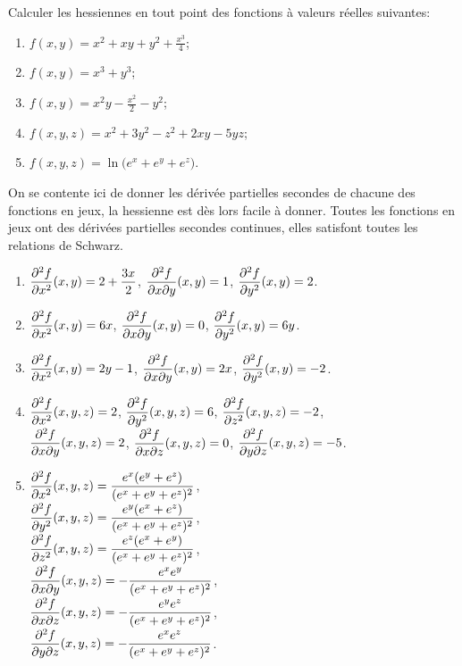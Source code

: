 \documentclass[11pt, a4paper]{article}
\begin{document}
\begin{question}
  \label{eq:hessienne}
  Calculer les hessiennes en tout point des fonctions à valeurs
  réelles suivantes:
  \begin{enumerate}
  \item $f(x, y) = x^2 + xy + y^2 + \displaystyle{\frac{x^3}{4}}$;
  \item $f(x, y) = x^3 + y^3$;
  \item $f(x, y) = x^2y - \displaystyle{\frac{x^2}{2}} - y^2$;
  \item $f(x, y, z) = x^2 + 3y^2 - z^2 + 2xy - 5yz$;
  \item $f(x, y, z) = \ln\big(e^x + e^y +e^z\big)$.
  \end{enumerate}
\end{question}
\begin{solution}
  On se contente ici de donner les dérivée partielles secondes de
  chacune des fonctions en jeux, la hessienne est dès lors facile à
  donner. Toutes les fonctions en jeux ont des dérivées partielles
  secondes continues, elles satisfont toutes les relations de Schwarz.
  \begin{enumerate}
  \item $\dfrac{\partial^2f}{\partial x^2}(x, y) = 2 + \dfrac{3x}{2}$,
    $\dfrac{\partial^2f}{\partial x\partial y}(x, y) = 1$,
    $\dfrac{\partial^2f}{\partial y^2}(x, y) = 2$.
  \item $\dfrac{\partial^2f}{\partial x^2}(x, y) = 6x$,
    $\dfrac{\partial^2f}{\partial x\partial y}(x, y) = 0$,
    $\dfrac{\partial^2f}{\partial y^2}(x, y) = 6y$.
  \item $\dfrac{\partial^2f}{\partial x^2}(x, y) = 2y - 1$,
    $\dfrac{\partial^2f}{\partial x\partial y}(x, y) = 2x$,
    $\dfrac{\partial^2f}{\partial y^2}(x, y) = -2$.
  \item $\dfrac{\partial^2f}{\partial x^2}(x, y, z) = 2$,
    $\dfrac{\partial^2f}{\partial y^2}(x, y, z) = 6$,
    $\dfrac{\partial^2f}{\partial z^2}(x, y, z) = -2$, \\
    $\dfrac{\partial^2f}{\partial x\partial y}(x, y, z) = 2$,
    $\dfrac{\partial^2f}{\partial x\partial z}(x, y, z) = 0$,
    $\dfrac{\partial^2f}{\partial y \partial z}(x, y, z) = -5$.
  \item $\dfrac{\partial^2f}{\partial x^2}(x, y, z) = \dfrac{e^x(e^y + e^z)}{(e^x + e^y + e^z)^2}$,\\ 
    $\dfrac{\partial^2f}{\partial y^2}(x, y, z) = \dfrac{e^y(e^x + e^z)}{(e^x + e^y + e^z)^2}$, \\
    $\dfrac{\partial^2f}{\partial z^2}(x, y, z) = \dfrac{e^z(e^x + e^y)}{(e^x + e^y + e^z)^2}$, \\ 
    $\dfrac{\partial^2f}{\partial x\partial y}(x, y, z) = -\dfrac{e^xe^y}{(e^x + e^y + e^z)^2}$, \\
    $\dfrac{\partial^2f}{\partial x\partial z}(x, y, z) = -\dfrac{e^ye^z}{(e^x + e^y + e^z)^2}$, \\
    $\dfrac{\partial^2f}{\partial y \partial z}(x, y, z) = -\dfrac{e^xe^z}{(e^x + e^y + e^z)^2}$. 
  \end{enumerate}
\end{solution}
\end{document}
